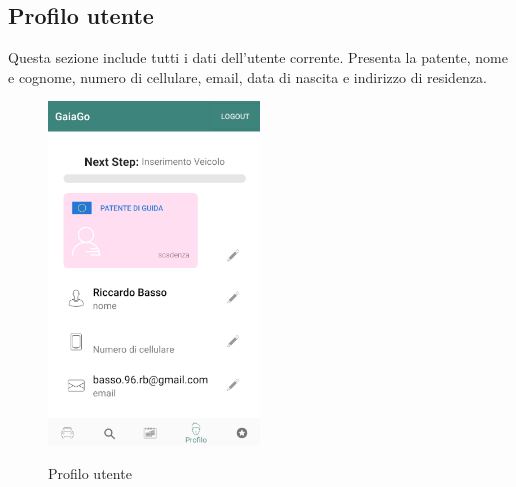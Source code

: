 \subsection{Profilo utente}
Questa sezione include tutti i dati dell'utente corrente. Presenta la patente, nome e cognome, numero di cellulare, email, data di nascita e indirizzo di residenza.
 \begin{figure}[H] 
	\centering 
	\includegraphics[width=0.5\textwidth]{res/images/profilo_utente.png}\\
	\caption{Profilo utente}
	\label{profilo}
\end{figure}
\pagebreak

